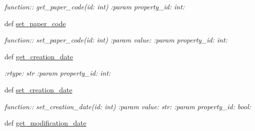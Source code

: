 \begin{DoxyCompactItemize}
\begin{DoxyCompactList}\small\item\em function\+:\+: get\+\_\+paper\+\_\+code(id\+: int) \+:param property\+\_\+id\+: int\+: \end{DoxyCompactList}\item 
def \hyperlink{classplume-creator_1_1src_1_1plume_1_1data_1_1property_1_1property__list_1_1_property_list_aeb1c5d0cae634a247adb0d574644845b}{set\+\_\+paper\+\_\+code}\hypertarget{classplume-creator_1_1src_1_1plume_1_1data_1_1property_1_1property__list_1_1_property_list_aeb1c5d0cae634a247adb0d574644845b}{}\label{classplume-creator_1_1src_1_1plume_1_1data_1_1property_1_1property__list_1_1_property_list_aeb1c5d0cae634a247adb0d574644845b}

\begin{DoxyCompactList}\small\item\em function\+:\+: set\+\_\+paper\+\_\+code(id\+: int) \+:param value\+: \+:param property\+\_\+id\+: int\+: \end{DoxyCompactList}\item 
def \hyperlink{classplume-creator_1_1src_1_1plume_1_1data_1_1property_1_1property__list_1_1_property_list_a283f45e0cd5facb81afd6b6670d9ffdb}{get\+\_\+creation\+\_\+date}\hypertarget{classplume-creator_1_1src_1_1plume_1_1data_1_1property_1_1property__list_1_1_property_list_a283f45e0cd5facb81afd6b6670d9ffdb}{}\label{classplume-creator_1_1src_1_1plume_1_1data_1_1property_1_1property__list_1_1_property_list_a283f45e0cd5facb81afd6b6670d9ffdb}

\begin{DoxyCompactList}\small\item\em \+:rtype\+: str \+:param property\+\_\+id\+: int\+: \end{DoxyCompactList}\item 
def \hyperlink{classplume-creator_1_1src_1_1plume_1_1data_1_1property_1_1property__list_1_1_property_list_addfc5507e856c9035aa16acb702fcbe7}{set\+\_\+creation\+\_\+date}\hypertarget{classplume-creator_1_1src_1_1plume_1_1data_1_1property_1_1property__list_1_1_property_list_addfc5507e856c9035aa16acb702fcbe7}{}\label{classplume-creator_1_1src_1_1plume_1_1data_1_1property_1_1property__list_1_1_property_list_addfc5507e856c9035aa16acb702fcbe7}

\begin{DoxyCompactList}\small\item\em function\+:\+: set\+\_\+creation\+\_\+date(id\+: int) \+:param value\+: str\+: \+:param property\+\_\+id\+: bool\+: \end{DoxyCompactList}\item 
def \hyperlink{classplume-creator_1_1src_1_1plume_1_1data_1_1property_1_1property__list_1_1_property_list_a081a8c2bb42b8ad4b569eb4bdede40d5}{get\+\_\+modification\+\_\+date}\hypertarget{classplume-creator_1_1src_1_1plume_1_1data_1_1property_1_1property__list_1_1_property_list_a081a8c2bb42b8ad4b569eb4bdede40d5}{}\label{classplume-creator_1_1src_1_1plume_1_1data_1_1property_1_1property__list_1_1_property_list_a081a8c2bb42b8ad4b569eb4bdede40d5}


\end{DoxyCompactItemize}
